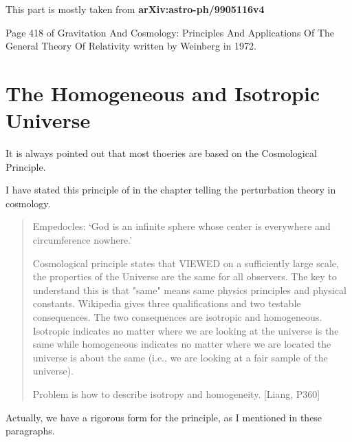 \documentclass[11pt]{book}
\begin{document}
This part is mostly taken from {\bf arXiv:astro-ph/9905116v4}

Page 418 of Gravitation And Cosmology: Principles And Applications Of The General Theory Of Relativity written by Weinberg in 1972.



















\section{The Homogeneous and Isotropic Universe}

It is always pointed out that most thoeries are based on the Cosmological Principle.

I have stated this principle of in the chapter telling the perturbation theory in cosmology.

\begin{quotation}
Empedocles: `God is an infinite sphere whose center is everywhere and circumference nowhere.'

Cosmological principle states that VIEWED on a sufficiently large scale, the properties of the Universe are the same for all observers. The key to understand this is that "same" means same physics principles and physical constants. 
Wikipedia gives three qualifications and two testable consequences. The two consequences are isotropic and homogeneous. Isotropic indicates no matter where we are looking at the universe is the same while homogeneous indicates no matter where we are located the universe is about the same (i.e., we are looking at a fair sample of the universe).

Problem is how to describe isotropy and homogeneity. [Liang, P360]
\end{quotation}

Actually, we have a rigorous form for the principle, as I mentioned in these paragraphs.
\end{document}
